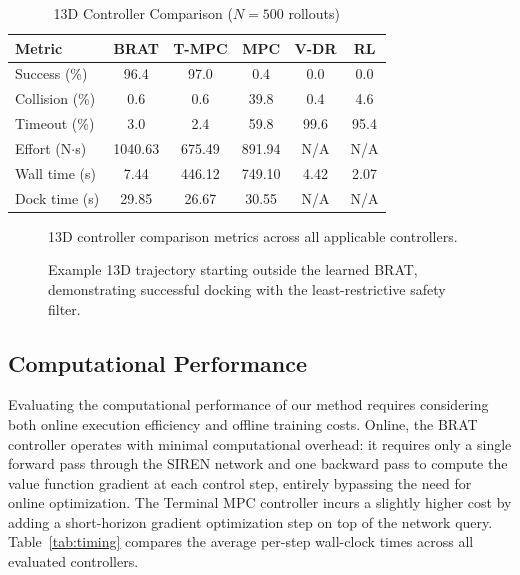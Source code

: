\documentclass[letterpaper, 10 pt, conference]{ieeeconf}
\begin{document}
\begin{table}[t]
\caption{13D Controller Comparison ($N = 500$ rollouts)}
\label{tab:13d_comparison}
\centering
\begin{tabular}{lccccc}
\toprule
Metric & BRAT & T-MPC & MPC & V-DR & RL \\
\midrule
Success (\%)       & 96.4 & 97.0 & 0.4 &  0.0 & 0.0 \\
Collision (\%)     & 0.6 & 0.6 & 39.8 & 0.4 & 4.6 \\
Timeout (\%)       & 3.0 & 2.4 & 59.8 & 99.6 & 95.4 \\
Effort (N$\cdot$s) & 1040.63 & 675.49 & 891.94 & N/A & N/A \\
Wall time (s)      & 7.44 & 446.12 & 749.10 & 4.42 & 2.07 \\
Dock time (s)      & 29.85 & 26.67 & 30.55 & N/A & N/A \\
\bottomrule
\end{tabular}
\end{table}

   \begin{figure}[t]
      \centering
      \caption{13D controller comparison metrics across all applicable controllers.}
      \label{fig:13d_metrics}
   \end{figure}

   \begin{figure}[t]
      \centering
      \caption{Example 13D trajectory starting outside the learned BRAT, demonstrating successful docking with the least-restrictive safety filter.}
      \label{fig:13d_trajectory}
   \end{figure}

\subsection{Computational Performance}
Evaluating the computational performance of our method requires considering both online execution efficiency and offline training costs. Online, the BRAT controller operates with minimal computational overhead: it requires only a single forward pass through the SIREN network and one backward pass to compute the value function gradient at each control step, entirely bypassing the need for online optimization. The Terminal MPC controller incurs a slightly higher cost by adding a short-horizon gradient optimization step on top of the network query. Table~\ref{tab:timing} compares the average per-step wall-clock times across all evaluated controllers.
\end{document}
